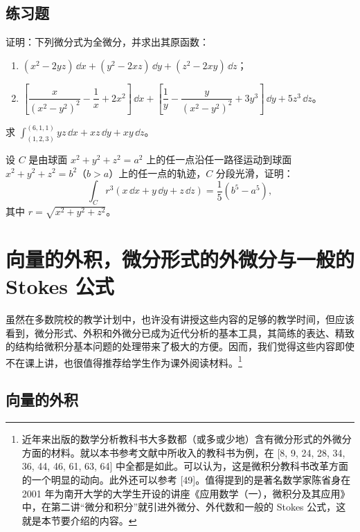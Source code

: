 \subsection{练习题}

\begin{xexercise}[1]
证明：下列微分式为全微分，并求出其原函数：
\begin{enumerate}[label=(\arabic*)]
\item $(x^2-2yz)\,\dd x+(y^2-2xz)\,\dd y+(z^2-2xy)\,\dd z$；
\item $\left[\dfrac{x}{(x^2-y^2)^2}-\dfrac1x+2x^2\right]\,\dd x+
\left[\dfrac1y-\dfrac{y}{(x^2-y^2)^2}+3y^3\right]\,\dd y+5z^3\,\dd z$。
\end{enumerate}
\end{xexercise}

\begin{xexercise}[2]
求 $\displaystyle\int_{(1,2,3)}^{(6,1,1)}yz\,\dd x+xz\,\dd y+xy\,\dd z$。
\end{xexercise}

\begin{xexercise}[3]
设 $C$ 是由球面 $x^2+y^2+z^2=a^2$ 上的任一点沿任一路径运动到球面 $x^2+y^2+z^2=b^2$（$b>a$）上的任一点的轨迹，$C$ 分段光滑，证明：
\[
  \int_C r^3(x\,\dd x+y\,\dd y+z\,\dd z)=\frac15(b^5-a^5),
\]
其中 $r=\sqrt{x^2+y^2+z^2}$。
\end{xexercise}

\section{向量的外积，微分形式的外微分与一般的 Stokes 公式}

虽然在多数院校的教学计划中，也许没有讲授这些内容的足够的教学时间，但应该看到，微分形式、外积和外微分已成为近代分析的基本工具，其简练的表达、精致的结构给微积分基本问题的处理带来了极大的方便。因而，我们觉得这些内容即使不在课上讲，也很值得推荐给学生作为课外阅读材料。\footnote{近年来出版的数学分析教科书大多数都（或多或少地）含有微分形式的外微分方面的材料。就以本书参考文献中所收入的教科书为例，在 [8, 9, 24, 28, 34, 36, 44, 46, 61, 63, 64] 中全都是如此。可以认为，这是微积分教科书改革方面的一个明显的动向。此外还可以参考 [49]。值得提到的是著名数学家陈省身在 2001 年为南开大学的大学生开设的讲座《应用数学（一），微积分及其应用》中，在第二讲“微分和积分”就引进外微分、外代数和一般的 Stokes 公式，这就是本节要介绍的内容。}

\subsection{向量的外积}

